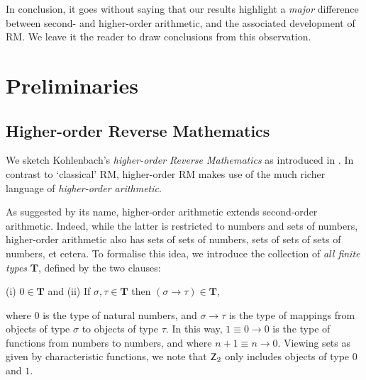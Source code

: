 \documentclass[reqno]{amsart}
\def\Z{\textup{\textsf{Z}}}
\def\di{\rightarrow}
\numberwithin{equation}{section}
\numberwithin{thm}{section}
\begin{document}
\smallskip

In conclusion, it goes without saying that our results highlight a \emph{major} difference between second- and higher-order arithmetic, and the associated development of RM.  We leave it the reader to draw conclusions from this observation.    


\section{Preliminaries}\label{preli}
\subsection{Higher-order Reverse Mathematics}\label{HORM}
We sketch Kohlenbach's \emph{higher-order Reverse Mathematics} as introduced in \cite{kohlenbach2}.  In contrast to `classical' RM, higher-order RM makes use of the much richer language of \emph{higher-order arithmetic}.  

\smallskip

As suggested by its name, {higher-order arithmetic} extends second-order arithmetic.  Indeed, while the latter is restricted to numbers and sets of numbers, higher-order arithmetic also has sets of sets of numbers, sets of sets of sets of numbers, et cetera.  
To formalise this idea, we introduce the collection of \emph{all finite types} $\mathbf{T}$, defined by the two clauses:
\begin{center}
(i) $0\in \mathbf{T}$   and   (ii)  If $\sigma, \tau\in \mathbf{T}$ then $( \sigma \di \tau) \in \mathbf{T}$,
\end{center}
where $0$ is the type of natural numbers, and $\sigma\di \tau$ is the type of mappings from objects of type $\sigma$ to objects of type $\tau$.
In this way, $1\equiv 0\di 0$ is the type of functions from numbers to numbers, and where  $n+1\equiv n\di 0$.  Viewing sets as given by characteristic functions, we note that $\Z_{2}$ only includes objects of type $0$ and $1$.    

\smallskip
\end{document}
